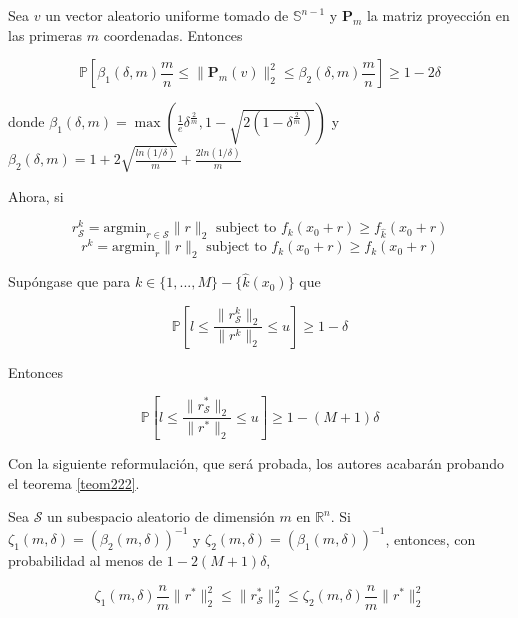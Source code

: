 \begin{lema} \label{lem221}
Sea $v$ un vector aleatorio uniforme tomado de $\mathbb{S}^{n-1}$ y $\textbf{P}_m$ la matriz proyección en las primeras $m$ coordenadas. Entonces

$$\mathbb{P} \left[ \beta_1 (\delta,m) \frac{m}{n} \leq \|\textbf{P}_m (v) \|_2^2 \leq \beta_2 (\delta,m) \frac{m}{n} \right] \geq 1-2 \delta$$

donde $\beta_1 (\delta,m)=\max \left( \frac{1}{e} \delta^{\frac{2}{m}},1-\sqrt{2(1-\delta^{\frac{2}{m}})} \right)$ y $\beta_2 (\delta,m)=1+2 \sqrt{\frac{ln(1/\delta)}{m}}+\frac{2 ln(1/\delta)}{m}$
\end{lema}

Ahora, si 

$$r_\mathcal{S}^k = \text{argmin}_{r \in \mathcal{S}} \|r \|_2 \text{ subject to } f_k(x_0 + r) \geq f_{\widehat{k}}(x_0 + r)$$
$$r^k = \text{argmin}_r \|r \|_2 \text{ subject to } f_k(x_0 + r) \geq f_k(x_0 + r)$$

\begin{lema} \label{lem222}
Supóngase que para $k \in \{1,...,M\}-\{\widehat{k}(x_0)\}$ que

$$\mathbb{P} \left[ l \leq \frac{\|r_\mathcal{S}^k \|_2}{\|r^k \|_2} \leq u \right] \geq 1 - \delta$$

Entonces

$$\mathbb{P} \left[ l \leq \frac{\|r_\mathcal{S}^* \|_2}{\|r^* \|_2} \leq u \right] \geq 1 - (M+1) \delta$$
\end{lema}

Con la siguiente reformulación, que será probada, los autores acabarán probando el teorema \ref{teom222}.

\begin{teorema}
Sea $\mathcal{S}$ un subespacio aleatorio de dimensión $m$ en $\mathbb{R}^n$. Si $\zeta_1 (m,\delta) = \left( \beta_2 (m,\delta) \right)^{-1}$ y $\zeta_2 (m,\delta) = \left( \beta_1 (m,\delta) \right)^{-1}$, entonces, con probabilidad al menos de $1-2(M+1) \delta$,

$$\zeta_1 (m,\delta) \frac{n}{m} \|r^* \|_2^2 \leq \|r_\mathcal{S}^* \|_2^2 \leq \zeta_2 (m,\delta) \frac{n}{m} \|r^* \|_2^2$$
\end{teorema}

